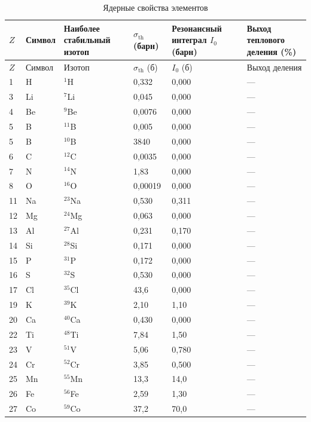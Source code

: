 \documentclass[12pt,a4paper]{article}
\begin{document}
	\begin{longtable}{p{0.8cm}p{1.2cm}p{2.0cm}p{2.5cm}p{2.5cm}p{2.5cm}}
		\caption{Ядерные свойства элементов} \label{tab:nuclear-properties-func} \\
		\toprule
		\(Z\) & Символ & Наиболее стабильный изотоп & \(\sigma_{\text{th}}\) (барн) & Резонансный интеграл \(I_0\) (барн) & Выход теплового деления (\%) \\
		\midrule
		\endfirsthead
		\toprule
		\(Z\) & Символ & Изотоп & \(\sigma_{\text{th}}\) (б) & \(I_0\) (б) & Выход деления \\
		\midrule
		\endhead
		1  & H  & \(^{1}\)H & 0,332 & 0,000 & --- \\
		3  & Li & \(^{7}\)Li & 0,045 & 0,000 & --- \\
		4  & Be & \(^{9}\)Be & 0,0076 & 0,000 & --- \\
		5  & B  & \(^{11}\)B & 0,005 & 0,000 & --- \\
		5  & B  & \(^{10}\)B & 3840 & 0,000 & --- \\
		6  & C  & \(^{12}\)C & 0,0035 & 0,000 & --- \\
		7  & N  & \(^{14}\)N & 1,83 & 0,000 & --- \\
		8  & O  & \(^{16}\)O & 0,00019 & 0,000 & --- \\
		11 & Na & \(^{23}\)Na & 0,530 & 0,311 & --- \\
		12 & Mg & \(^{24}\)Mg & 0,063 & 0,000 & --- \\
		13 & Al & \(^{27}\)Al & 0,231 & 0,170 & --- \\
		14 & Si & \(^{28}\)Si & 0,171 & 0,000 & --- \\
		15 & P  & \(^{31}\)P & 0,172 & 0,000 & --- \\
		16 & S  & \(^{32}\)S & 0,530 & 0,000 & --- \\
		17 & Cl & \(^{35}\)Cl & 43,6 & 0,000 & --- \\
		19 & K  & \(^{39}\)K & 2,10 & 1,10 & --- \\
		20 & Ca & \(^{40}\)Ca & 0,430 & 0,000 & --- \\
		22 & Ti & \(^{48}\)Ti & 7,84 & 1,50 & --- \\
		23 & V  & \(^{51}\)V & 5,06 & 0,780 & --- \\
		24 & Cr & \(^{52}\)Cr & 3,85 & 0,500 & --- \\
		25 & Mn & \(^{55}\)Mn & 13,3 & 14,0 & --- \\
		26 & Fe & \(^{56}\)Fe & 2,59 & 1,30 & --- \\
		27 & Co & \(^{59}\)Co & 37,2 & 70,0 & --- \\

\end{longtable}
\end{document}

